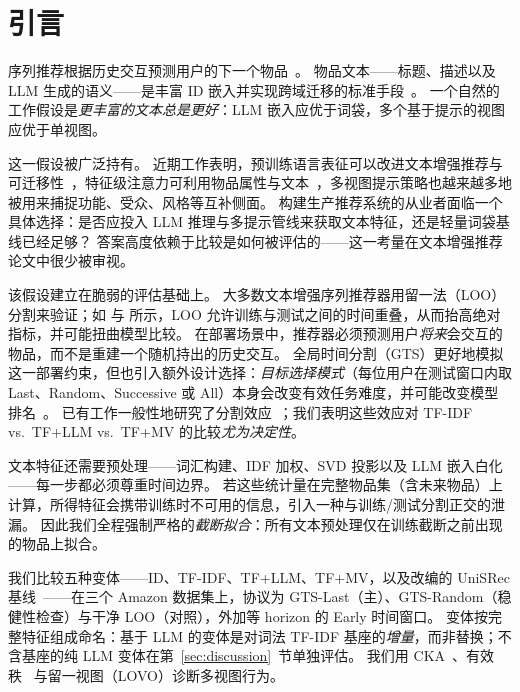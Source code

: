 \documentclass[sigconf,natbib=true,anonymous]{acmart}
\newcommand{\tfidf}{\textsc{TF-IDF}\xspace}
\newcommand{\llm}{\textsc{LLM}\xspace}
\newcommand{\tfllm}{\textsc{TF+LLM}\xspace}
\newcommand{\tfmv}{\textsc{TF+MV}\xspace}
\begin{document}
\maketitle

\section{引言}
\label{sec:intro}

序列推荐根据历史交互预测用户的下一个物品~\cite{kang2018sasrec,sun2019bert4rec,hidasi2016gru4rec}。
物品文本——标题、描述以及 LLM 生成的语义——是丰富 ID 嵌入并实现跨域迁移的标准手段~\cite{hou2022unisrec,bao2023tallrec}。
一个自然的工作假设是\emph{更丰富的文本总是更好}：LLM 嵌入应优于词袋，多个基于提示的视图应优于单视图。

这一假设被广泛持有。
近期工作表明，预训练语言表征可以改进文本增强推荐与可迁移性~\cite{hou2022unisrec,li2023recformer,bao2023tallrec}，特征级注意力可利用物品属性与文本~\cite{zhang2019fdsa}，多视图提示策略也越来越多地被用来捕捉功能、受众、风格等互补侧面。
构建生产推荐系统的从业者面临一个具体选择：是否应投入 LLM 推理与多提示管线来获取文本特征，还是轻量词袋基线已经足够？
答案高度依赖于比较是如何被评估的——这一考量在文本增强推荐论文中很少被审视。

该假设建立在脆弱的评估基础上。
大多数文本增强序列推荐器用留一法（LOO）分割来验证；如 \citet{ji2023evaluation} 与 \citet{sun2023reevaluation} 所示，LOO 允许训练与测试之间的时间重叠，从而抬高绝对指标，并可能扭曲模型比较。
在部署场景中，推荐器必须预测用户\emph{将来}会交互的物品，而不是重建一个随机持出的历史交互。
全局时间分割（GTS）更好地模拟这一部署约束，但也引入额外设计选择：\emph{目标选择模式}（每位用户在测试窗口内取 Last、Random、Successive 或 All）本身会改变有效任务难度，并可能改变模型排名~\cite{gusak2025time}。
已有工作一般性地研究了分割效应~\cite{meng2020temporal,ji2023evaluation}；我们表明这些效应对 \tfidf vs.\ \tfllm vs.\ \tfmv 的比较\emph{尤为决定性}。

文本特征还需要预处理——词汇构建、IDF 加权、SVD 投影以及 LLM 嵌入白化——每一步都必须尊重时间边界。
若这些统计量在完整物品集（含未来物品）上计算，所得特征会携带训练时不可用的信息，引入一种与训练/测试分割正交的泄漏。
因此我们全程强制严格的\emph{截断拟合}：所有文本预处理仅在训练截断之前出现的物品上拟合。

我们比较五种变体——ID、\tfidf、\tfllm、\tfmv，以及改编的 UniSRec 基线~\cite{hou2022unisrec}——在三个 Amazon 数据集上，协议为 GTS-Last（主）、GTS-Random（稳健性检查）与干净 LOO（对照），外加等 horizon 的 Early 时间窗口。
变体按完整特征组成命名：基于 \llm 的变体是对词法 \tfidf 基座的\emph{增量}，而非替换；不含基座的纯 LLM 变体在第~\ref{sec:discussion}~节单独评估。
我们用 CKA~\cite{kornblith2019cka}、有效秩~\cite{roy2007effective} 与留一视图（LOVO）诊断多视图行为。
\end{document}
